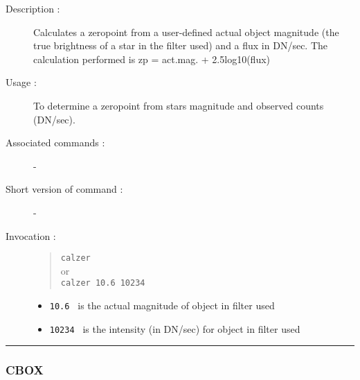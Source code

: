 \begin{description}

\item[Description :] Calculates a zeropoint from a user-defined actual
object magnitude (the true brightness of a star in the filter used) and
a flux in DN/sec.  The calculation performed is zp = act.mag. +
2.5log10(flux)

\item[Usage :] To determine a zeropoint from stars magnitude and
observed counts (DN/sec).
\item[Associated commands :] -
\item[Short version of command :] -
\item[Invocation :]

\begin{quote}{\tt  calzer }\\
or \\
{\tt calzer 10.6 10234 }
\end{quote}

\begin{itemize}

\item {\tt 10.6 } is the actual magnitude of object in filter used
\item {\tt 10234 } is the intensity (in DN/sec) for object in filter used

\end{itemize}
\end{description}

\hrule
\subsubsection*{\label{CBOX}CBOX}


